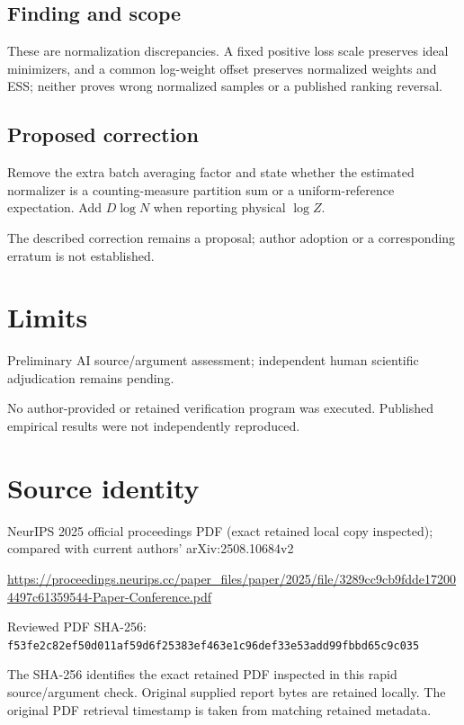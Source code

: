 \documentclass[11pt]{article}
\begin{document}
\subsection*{Finding and scope}

These are normalization discrepancies. A fixed positive loss scale preserves ideal minimizers, and a common log-weight offset preserves normalized weights and ESS; neither proves wrong normalized samples or a published ranking reversal.

\subsection*{Proposed correction}

Remove the extra batch averaging factor and state whether the estimated normalizer is a counting-measure partition sum or a uniform-reference expectation. Add \(D\log N\) when reporting physical \(\log Z\).

The described correction remains a proposal; author adoption or a corresponding erratum is not established.

\section*{Limits}

Preliminary AI source/argument assessment; independent human scientific adjudication remains pending.\par

No author-provided or retained verification program was executed. Published empirical results were not independently reproduced.\par

\section*{Source identity}

NeurIPS 2025 official proceedings PDF (exact retained local copy inspected); compared with current authors’ arXiv:2508.10684v2

\url{https://proceedings.neurips.cc/paper_files/paper/2025/file/3289cc9cb9fdde172004497c61359544-Paper-Conference.pdf}

Reviewed PDF SHA-256: \nolinkurl{f53fe2c82ef50d011af59d6f25383ef463e1c96def33e53add99fbbd65c9c035}

The SHA-256 identifies the exact retained PDF inspected in this rapid source/argument check. Original supplied report bytes are retained locally. The original PDF retrieval timestamp is taken from matching retained metadata.
\end{document}
